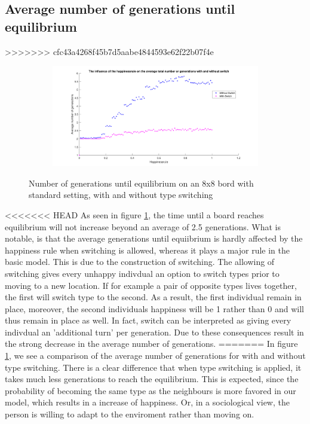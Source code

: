 \subsection{Average number of generations until equilibrium}
>>>>>>> cfc43a4268f45b7d5aabe4844593e62f22b07f4e
\begin{figure}[H]
	\centering
    \begin{subfigure}{0.9\textwidth}
        \includegraphics[width=\textwidth]{happinessrule-totaantgenwithswitchorwithoutswitch}
    \end{subfigure}
    \caption{Number of generations until equilibrium on an 8x8 bord with standard setting, with and without type switching}
    \label{fig:AantGenS}
\end{figure}
<<<<<<< HEAD
As seen in figure \ref{fig:AantGenS}, the time until a board reaches equilibrium will not increase beyond an average of 2.5 generations. 
What is notable, is that the average generations until equiibrium is hardly affected by the happiness rule when switching is allowed, whereas it plays a major rule in the basic model. 
This is due to the construction of switching. The allowing of switching gives every unhappy indivdual an option to switch types prior to moving to a new location. 
If for example a pair of opposite types lives together, the first will switch type to the second. As a result, the first individual remain in place, moreover, the second individuals happiness will be 1 rather than 0 and will thus remain in place as well. 
In fact, switch can be interpreted as giving every indivdual an 'additional turn' per generation. Due to these consequences result in the strong decrease in the average number of generations.
=======
In figure \ref{fig:AantGenS}, we see a comparison of the average number of generations for with and without type switching. There is a clear difference that when type switching is applied, it takes much less generations to reach the equilibrium. This is expected, since the probability of becoming the same type as the neighbours is more favored in our model, which results in a increase of happiness. Or, in a sociological view, the person is willing to adapt to the enviroment rather than moving on.\\

